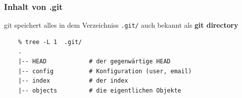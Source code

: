 \documentclass{beamer}
\begin{document}




\begin{frame}[fragile]
\frametitle{Inhalt von .git}

git speichert alles in dem Verzeichniss {\tt.git/} auch bekannt als \textbf{git
directory}

\begin{verbatim}
    % tree -L 1  .git/
    .
    |-- HEAD            # der gegenwärtige HEAD
    |-- config          # Konfiguration (user, email)
    |-- index           # der index
    |-- objects         # die eigentlichen Objekte

\end{verbatim}

\end{frame}
\end{document}
